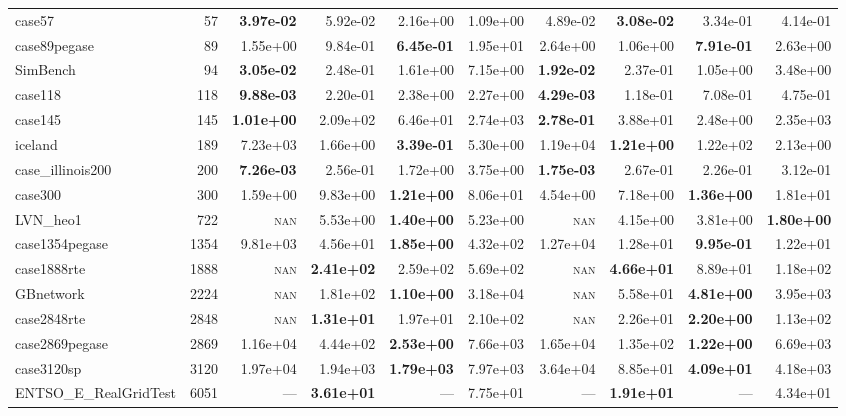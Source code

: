 \documentclass[10pt]{article}
\begin{document}
\begin{table}[H]
\begin{tabular}{lr rrrr rrrr}
case57 & 57 & \textbf{3.97e-02} & 5.92e-02 & 2.16e+00 & 1.09e+00 & 4.89e-02 & \textbf{3.08e-02} & 3.34e-01 & 4.14e-01 \\
case89pegase & 89 & 1.55e+00 & 9.84e-01 & \textbf{6.45e-01} & 1.95e+01 & 2.64e+00 & 1.06e+00 & \textbf{7.91e-01} & 2.63e+00 \\
SimBench & 94 & \textbf{3.05e-02} & 2.48e-01 & 1.61e+00 & 7.15e+00 & \textbf{1.92e-02} & 2.37e-01 & 1.05e+00 & 3.48e+00 \\
case118 & 118 & \textbf{9.88e-03} & 2.20e-01 & 2.38e+00 & 2.27e+00 & \textbf{4.29e-03} & 1.18e-01 & 7.08e-01 & 4.75e-01 \\
case145 & 145 & \textbf{1.01e+00} & 2.09e+02 & 6.46e+01 & 2.74e+03 & \textbf{2.78e-01} & 3.88e+01 & 2.48e+00 & 2.35e+03 \\
iceland & 189 & 7.23e+03 & 1.66e+00 & \textbf{3.39e-01} & 5.30e+00 & 1.19e+04 & \textbf{1.21e+00} & 1.22e+02 & 2.13e+00 \\
case\_illinois200 & 200 & \textbf{7.26e-03} & 2.56e-01 & 1.72e+00 & 3.75e+00 & \textbf{1.75e-03} & 2.67e-01 & 2.26e-01 & 3.12e-01 \\
case300 & 300 & 1.59e+00 & 9.83e+00 & \textbf{1.21e+00} & 8.06e+01 & 4.54e+00 & 7.18e+00 & \textbf{1.36e+00} & 1.81e+01 \\
LVN\_heo1 & 722 & \textsc{nan} & 5.53e+00 & \textbf{1.40e+00} & 5.23e+00 & \textsc{nan} & 4.15e+00 & 3.81e+00 & \textbf{1.80e+00} \\
case1354pegase & 1354 & 9.81e+03 & 4.56e+01 & \textbf{1.85e+00} & 4.32e+02 & 1.27e+04 & 1.28e+01 & \textbf{9.95e-01} & 1.22e+01 \\
case1888rte & 1888 & \textsc{nan} & \textbf{2.41e+02} & 2.59e+02 & 5.69e+02 & \textsc{nan} & \textbf{4.66e+01} & 8.89e+01 & 1.18e+02 \\
GBnetwork & 2224 & \textsc{nan} & 1.81e+02 & \textbf{1.10e+00} & 3.18e+04 & \textsc{nan} & 5.58e+01 & \textbf{4.81e+00} & 3.95e+03 \\
case2848rte & 2848 & \textsc{nan} & \textbf{1.31e+01} & 1.97e+01 & 2.10e+02 & \textsc{nan} & 2.26e+01 & \textbf{2.20e+00} & 1.13e+02 \\
case2869pegase & 2869 & 1.16e+04 & 4.44e+02 & \textbf{2.53e+00} & 7.66e+03 & 1.65e+04 & 1.35e+02 & \textbf{1.22e+00} & 6.69e+03 \\
case3120sp & 3120 & 1.97e+04 & 1.94e+03 & \textbf{1.79e+03} & 7.97e+03 & 3.64e+04 & 8.85e+01 & \textbf{4.09e+01} & 4.18e+03 \\
ENTSO\_E\_RealGridTest & 6051 & --- & \textbf{3.61e+01} & --- & 7.75e+01 & --- & \textbf{1.91e+01} & --- & 4.34e+01 \\

\end{tabular}
\end{table}
\end{document}
